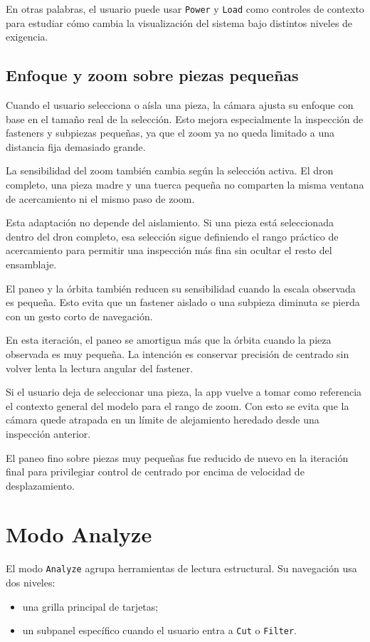 \documentclass[12pt,letterpaper]{article}
\begin{document}
\noindent En otras palabras, el usuario puede usar \texttt{Power} y \texttt{Load} como controles de contexto para estudiar cómo cambia la visualización del sistema bajo distintos niveles de exigencia.

\subsection{Enfoque y zoom sobre piezas pequeñas}
Cuando el usuario selecciona o aísla una pieza, la cámara ajusta su enfoque con base en el tamaño real de la selección. Esto mejora especialmente la inspección de fasteners y subpiezas pequeñas, ya que el zoom ya no queda limitado a una distancia fija demasiado grande.

\noindent La sensibilidad del zoom también cambia según la selección activa. El dron completo, una pieza madre y una tuerca pequeña no comparten la misma ventana de acercamiento ni el mismo paso de zoom.

\noindent Esta adaptación no depende del aislamiento. Si una pieza está seleccionada dentro del dron completo, esa selección sigue definiendo el rango práctico de acercamiento para permitir una inspección más fina sin ocultar el resto del ensamblaje.

\noindent El paneo y la órbita también reducen su sensibilidad cuando la escala observada es pequeña. Esto evita que un fastener aislado o una subpieza diminuta se pierda con un gesto corto de navegación.

\noindent En esta iteración, el paneo se amortigua más que la órbita cuando la pieza observada es muy pequeña. La intención es conservar precisión de centrado sin volver lenta la lectura angular del fastener.

\noindent Si el usuario deja de seleccionar una pieza, la app vuelve a tomar como referencia el contexto general del modelo para el rango de zoom. Con esto se evita que la cámara quede atrapada en un límite de alejamiento heredado desde una inspección anterior.

\noindent El paneo fino sobre piezas muy pequeñas fue reducido de nuevo en la iteración final para privilegiar control de centrado por encima de velocidad de desplazamiento.

\section{Modo Analyze}
El modo \texttt{Analyze} agrupa herramientas de lectura estructural. Su navegación usa dos niveles:
\begin{itemize}
    \item una grilla principal de tarjetas;
    \item un subpanel específico cuando el usuario entra a \texttt{Cut} o \texttt{Filter}.
\end{itemize}
\end{document}
